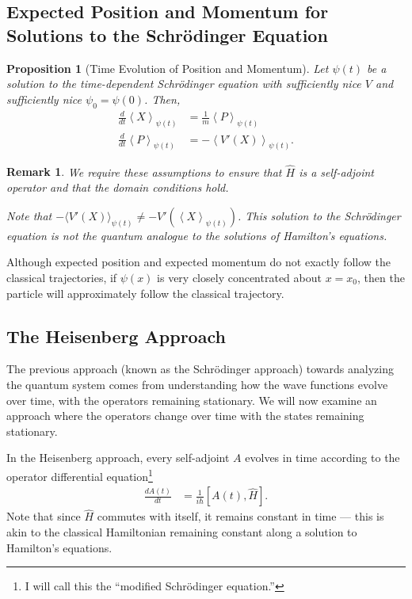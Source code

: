\documentclass[12pt]{extarticle}
\newtheorem*{remark}{Remark}
\theoremstyle{plain}
\newtheorem*{proposition}{Proposition}%
\theoremstyle{definition}
\theoremstyle{remark}
\renewcommand{\newline}{\hfill\break}
\begin{document}
  \subsection{Expected Position and Momentum for Solutions to the Schrödinger Equation}%
  \begin{proposition}[Time Evolution of Position and Momentum]
    Let $\psi(t)$ be a solution to the time-dependent Schrödinger equation with sufficiently nice $V$ and sufficiently nice $\psi_0 = \psi(0)$. Then,
    \begin{align*}
      \frac{d}{dt}\left\langle X\right\rangle_{\psi(t)} &= \frac{1}{m}\left\langle P\right\rangle_{\psi(t)}\\
      \frac{d}{dt}\left\langle P\right\rangle_{\psi(t)} &= -\left\langle V'(X)\right\rangle_{\psi(t)}.
    \end{align*}
  \end{proposition}
  \begin{remark}
    We require these assumptions to ensure that $\hat{H}$ is a self-adjoint operator and that the domain conditions hold.\newline

    Note that $-\langle V'(X)\rangle_{\psi(t)}\neq -V'\left(\left\langle X\right\rangle_{\psi(t)}\right)$. This solution to the Schrödinger equation is not the quantum analogue to the solutions of Hamilton's equations.
  \end{remark}
  Although expected position and expected momentum do not exactly follow the classical trajectories, if $\psi(x)$ is very closely concentrated about $x = x_0$, then the particle will approximately follow the classical trajectory.
  \subsection{The Heisenberg Approach}%
  The previous approach (known as the Schrödinger approach) towards analyzing the quantum system comes from understanding how the wave functions evolve over time, with the operators remaining stationary. We will now examine an approach where the operators change over time with the states remaining stationary.\newline

  In the Heisenberg approach, every self-adjoint $A$ evolves in time according to the operator differential equation\footnote{I will call this the ``modified Schrödinger equation.''}
  \begin{align*}
    \frac{dA(t)}{dt} &= \frac{1}{i\hbar}[A(t),\hat{H}].
  \end{align*}
  Note that since $\hat{H}$ commutes with itself, it remains constant in time --- this is akin to the classical Hamiltonian remaining constant along a solution to Hamilton's equations.\newline
\end{document}
